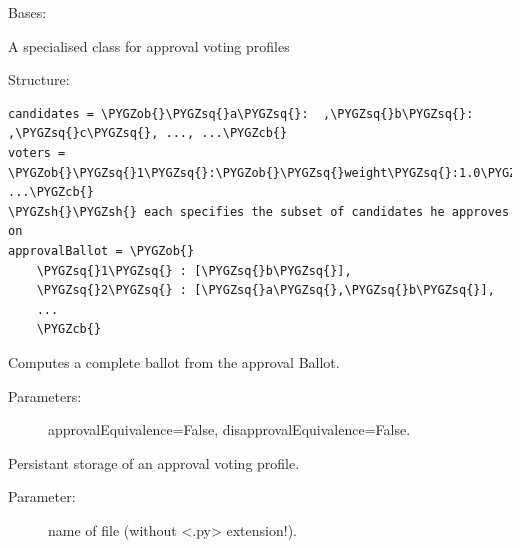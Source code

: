 \documentclass[letterpaper,10pt,english]{sphinxmanual}
\def\PYGZob{\char`\{}
\def\PYGZcb{\char`\}}
\def\PYGZsh{\char`\#}
\def\PYGZsq{\char`\'}
\begin{document}
\begin{fulllineitems}
\label{techDoc:votingDigraphs.ApprovalVotingProfile}
Bases: {\hyperref[techDoc:votingDigraphs.VotingProfile]{}}

A specialised class for approval voting profiles

Structure:

\begin{Verbatim}[commandchars=\\\{\}]
candidates = \PYGZob{}\PYGZsq{}a\PYGZsq{}:  ,\PYGZsq{}b\PYGZsq{}:  ,\PYGZsq{}c\PYGZsq{}, ..., ...\PYGZcb{}
voters = \PYGZob{}\PYGZsq{}1\PYGZsq{}:\PYGZob{}\PYGZsq{}weight\PYGZsq{}:1.0\PYGZcb{},\PYGZsq{}2\PYGZsq{}:\PYGZob{}\PYGZsq{}weight\PYGZsq{}:1.0\PYGZcb{}, ...\PYGZcb{}
\PYGZsh{}\PYGZsh{} each specifies the subset of candidates he approves on
approvalBallot = \PYGZob{}
    \PYGZsq{}1\PYGZsq{} : [\PYGZsq{}b\PYGZsq{}],
    \PYGZsq{}2\PYGZsq{} : [\PYGZsq{}a\PYGZsq{},\PYGZsq{}b\PYGZsq{}],
    ...
    \PYGZcb{}
\end{Verbatim}

\begin{fulllineitems}
\label{techDoc:votingDigraphs.ApprovalVotingProfile.computeBallot}
Computes a complete ballot from the approval Ballot.
\begin{description}
\item[{Parameters:}] \leavevmode
approvalEquivalence=False, disapprovalEquivalence=False.

\end{description}

\end{fulllineitems}


\begin{fulllineitems}
\label{techDoc:votingDigraphs.ApprovalVotingProfile.save}
Persistant storage of an approval voting profile.
\begin{description}
\item[{Parameter:}] \leavevmode
name of file (without \textless{}.py\textgreater{} extension!).


\end{description}
\end{fulllineitems}
\end{fulllineitems}
\end{document}
